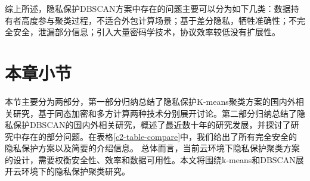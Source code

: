 综上所述，隐私保护DBSCAN方案中存在的问题主要可以分为如下几类：数据持有者高度参与聚类过程，不适合外包计算场景；基于差分隐私，牺牲准确性；不完全安全，泄漏部分信息；引入大量密码学技术，协议效率较低没有扩展性。

\section{本章小节}
本节主要分为两部分，第一部分归纳总结了隐私保护K-means聚类方案的国内外相关研究，基于同态加密和多方计算两种技术分别展开讨论。第二部分归纳总结了隐私保护DBSCAN的国内外相关研究，概述了最近数十年的研究发展，并探讨了研究中存在的部分问题。在表格\ref{c2-table-compare}中，我们给出了所有完全安全的隐私保护方案以及简要的介绍信息。
总体而言，当前云环境下隐私保护聚类方案的设计，需要权衡安全性、效率和数据可用性。本文将围绕k-means和DBSCAN展开云环境下的隐私保护聚类研究。

\begin{table}[htbp]
	\centering	
	\renewcommand{\arraystretch}{0.9}
	\caption{完全安全的隐私保护K-means和DBSCAN方案}
	\label{c2-table-compare}
\end{table}
